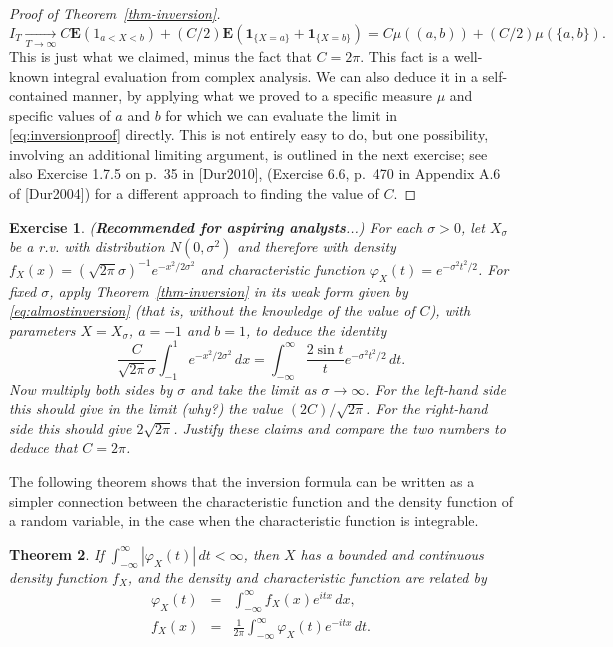 \documentclass[12pt]{article}
\newtheorem{thm}{Theorem}[section]
\newtheorem{exercise}[thm]{Exercise}
\newcommand{\expec}{\mathbf{E}}
\newcommand{\ind}{\textbf{1}}
\theoremstyle{example}
\begin{document}
\begin{proof}[Proof of Theorem~\ref{thm-inversion}]
\begin{equation} \label{eq:almostinversion}
I_T \xrightarrow[T\to\infty]{} C \expec(1_{a<X<b}) + (C/2) \expec(\ind_{\{X=a\}} + \ind_{\{X=b\}}) = C \mu((a,b)) + (C/2)\mu(\{a,b\}).
\end{equation}
This is just what we claimed, minus the fact that $C=2\pi$. This fact is a well-known integral evaluation from complex analysis. We can also deduce it in a self-contained manner, by applying what we proved to a specific measure $\mu$ and specific values of $a$ and $b$ for which we can evaluate the limit in \eqref{eq:inversionproof} directly. This is not entirely easy to do, but one possibility, involving an additional limiting argument, is outlined in the next exercise; see also Exercise 1.7.5 on p.\ 35 in [Dur2010], (Exercise 6.6, p.\ 470 in Appendix A.6 of [Dur2004]) for a different approach to finding the value of $C$.
\end{proof}

\begin{exercise} (\textbf{Recommended for aspiring analysts}...) For each $\sigma>0$, let $X_\sigma$ be a r.v. with distribution $N(0,\sigma^2)$ and therefore with density $f_X(x)=(\sqrt{2\pi}\sigma)^{-1} e^{-x^2/2\sigma^2}$ and characteristic function $\varphi_X(t) = e^{-\sigma^2 t^2/2}$. For fixed $\sigma$, apply Theorem~\ref{thm-inversion} in its weak form given by \eqref{eq:almostinversion} (that is, without the knowledge of the value of $C$), with parameters $X=X_\sigma$, $a=-1$ and $b=1$,  to deduce the identity
$$ \frac{C}{\sqrt{2\pi}\sigma} \int_{-1}^1 e^{-x^2/2\sigma^2}\,dx = \int_{-\infty}^\infty \frac{2\sin t}{t} e^{-\sigma^2 t^2/2}\,dt. $$
Now multiply both sides by $\sigma$ and take the limit as $\sigma\to\infty$. For the left-hand side this should give in the limit (why?) the value $(2C)/\sqrt{2\pi}$. For the right-hand side this should give $2\sqrt{2\pi}$. Justify these claims and compare the two numbers to deduce that $C=2\pi$.
\end{exercise}

The following theorem shows that the inversion formula can be written as a simpler connection between the characteristic function and the density function of a random variable, in the case when the characteristic function is integrable.

\begin{thm}
If $\int_{-\infty}^\infty |\varphi_X(t)|\,dt < \infty$, then $X$ has a bounded and continuous density function $f_X$, and the density and characteristic function are related by
\begin{eqnarray*}
 \varphi_X(t) &=& \int_{-\infty}^\infty f_X(x) e^{itx}\,dx,  \\
f_X(x) &=& \frac{1}{2\pi} \int_{-\infty}^\infty \varphi_X(t) e^{-itx}\,dt.
\end{eqnarray*}
\end{thm}
\end{document}
